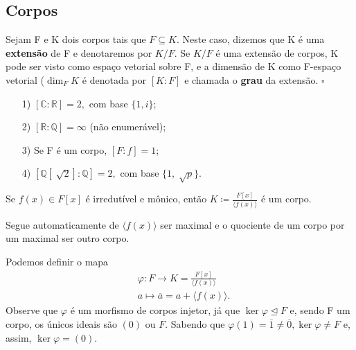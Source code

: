\documentclass[algebraII_notes.tex]{subfiles}
\begin{document}
\subsection{Corpos}
\begin{def*}
	Sejam F e K dois corpos tais que \(F\subseteq{K}.\) Neste caso, dizemos que K é uma \textbf{extensão} de F e denotaremos por
	\(K/F.\) Se \(K/F\) é uma extensão de corpos, K pode ser visto como espaço vetorial sobre F, e a dimensão de K
	como F-espaço vetorial (\(\dim_{F}K\) é denotada por \([K:F]\) e chamada o \textbf{grau} da extensão. \(\square\)
\end{def*}
\begin{example}
	\begin{itemize}
		\item[1)] \([\mathbb{C}:\mathbb{R}] = 2,\) com base \(\{1, i\}\);
		\item[2)] \([\mathbb{R}:\mathbb{Q}] = \infty\) (não enumerável);
		\item[3)] Se F é um corpo, \([F:f]=1\);
		\item[4)] \([\mathbb{Q}[\sqrt[]{2}]:\mathbb{Q}] = 2,\) com base \(\{1, \sqrt[]{p}\}\).
	\end{itemize}
\end{example}
\begin{crl*}
	Se \(f(x)\in F[x]\) é irredutível e mônico, então \(K\coloneqq \frac{F[x]}{\langle f(x) \rangle}\) é um corpo.
\end{crl*}
\begin{proof*}
	Segue automaticamente de \(\langle f(x) \rangle \) ser maximal e o quociente de um corpo por um maximal ser outro corpo. \qedsymbol
\end{proof*}
Podemos definir o mapa
\begin{align*}
	 & \varphi :F\rightarrow K=\frac{F[x]}{\langle f(x) \rangle} \\
	 & a\mapsto \overline{a} = a + \langle f(x) \rangle.
\end{align*}
Observe que \(\varphi \) é um morfismo de corpos injetor, já que \(\ker{\varphi } \trianglelefteq{F}\) e,
sendo F um corpo, os únicos ideais são \((0)\) ou \(F\). Sabendo que \(\varphi(1) = \overline{1}\neq\overline{0}, \ker{\varphi }\neq F\) e,
assim, \(\ker{\varphi } = (0).\)
\end{document}
